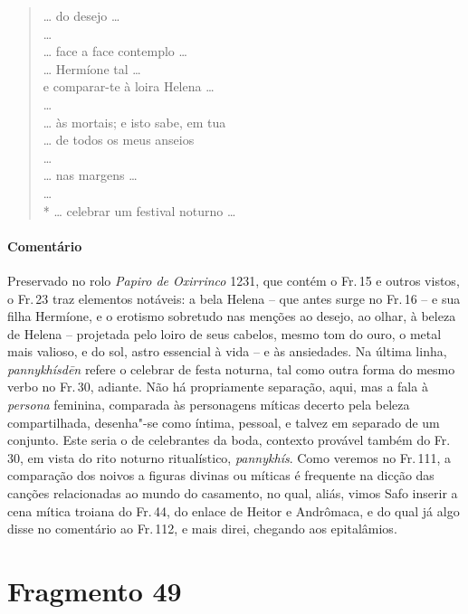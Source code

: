 \begin{verse}
\ldots{} do desejo \ldots{}\\
\ldots{}\\
\ldots{} face a face contemplo \ldots{}\\
\ldots{} Hermíone tal \ldots{}\\
e comparar-te à loira Helena \ldots{}\\
\ldots{}\\
\ldots{} às mortais; e isto sabe, em tua\\
\ldots{} de todos os meus anseios\\
\ldots{}\\
\ldots{} nas margens \ldots{}\\
\ldots{}\\*
\ldots{} celebrar um festival noturno \ldots{} 
\end{verse}

\pagebreak

{\paragraph{Comentário} Preservado no rolo \textit{Papiro de Oxirrinco} 1231, que contém o Fr.\,15 e outros vistos, o Fr.\,23 traz elementos notáveis: a bela Helena -- que antes surge no Fr.\,16 -- e sua filha Hermíone, e o erotismo sobretudo nas menções ao desejo, ao olhar, à beleza de Helena -- projetada pelo loiro de seus cabelos, mesmo tom do ouro, o metal mais valioso, e do sol, astro essencial à vida -- e às ansiedades. Na última linha, \textit{pannykhísdēn} refere o celebrar de festa noturna, tal como outra forma do mesmo verbo no Fr.\,30, adiante. Não há propriamente separação, aqui, mas a fala à \textit{persona} feminina, comparada às personagens míticas decerto pela beleza compartilhada, desenha"-se como íntima, pessoal, e talvez em separado de um conjunto. Este seria o de celebrantes da boda, contexto provável também do Fr.\,30, em vista do rito noturno ritualístico, \textit{pannykhís}. Como veremos no Fr.\,111, a comparação dos noivos a figuras divinas ou míticas é frequente na dicção das canções relacionadas ao mundo do casamento, no qual, aliás, vimos Safo inserir a cena mítica troiana do Fr.\,44, do enlace de Heitor e Andrômaca, e do qual já algo disse no comentário ao Fr.\,112, e mais direi, chegando aos epitalâmios.}

\pagebreak
\section{Fragmento 49}

